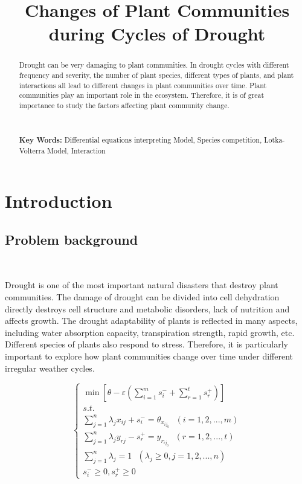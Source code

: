 \documentclass[12pt]{article}
\title{Changes of Plant Communities during Cycles of Drought}
\begin{document}
\begin{abstract}
Drought can be very damaging to plant communities. In drought cycles with different frequency and severity, the number of plant species, different types of plants, and plant interactions all lead to different changes in plant communities over time. Plant communities play an important role in the ecosystem. Therefore, it is of great importance to study the factors affecting plant community change.

\

\noindent \textbf{Key Words:} Differential equations interpreting Model, Species competition, Lotka-Volterra Model, Interaction
\end{abstract}

\maketitle
\newpage
\tableofcontents
\pagestyle{fancy}
\setcounter{page}{1}

\section{Introduction}
\subsection{Problem background}
\

Drought is one of the most important natural disasters that destroy plant communities. The damage of drought can be divided into cell dehydration directly destroys cell structure and metabolic disorders, lack of nutrition and affects growth. The drought adaptability of plants is reflected in many aspects, including water absorption capacity, transpiration strength, rapid growth, etc. Different species of plants also respond to stress. Therefore, it is particularly important to explore how plant communities change over time under different irregular weather cycles.
\begin{large}
\begin{equation}
\begin{cases}
    \min[\theta-\varepsilon(\sum\limits_{i=1}^{m}s_{i}^{-}+\sum\limits_{r=1}^{t}s_{r}^{+})]
    \\
    s.t.
    \\
    \sum\limits_{j=1}^{n}\lambda_jx_{ij}+s_{i}^{-}=\theta_{x_{ij_0}}\ \ \ (i=1,2,...,m)
    \\
    \sum\limits_{j=1}^{n}\lambda_jy_{rj}-s_{r}^{+}=y_{r_{ij_0}}\ \ \ (r=1,2,...,t)
    \\
    \sum\limits_{j=1}^{n}\lambda_j=1\ \ \ (\lambda_j\geqslant0,j=1,2,...,n)
    \\
    s_{i}^{-}\geqslant0,s_{r}^{+}\geqslant0
\end{cases}
\end{equation}
\end{large}
\end{document}
